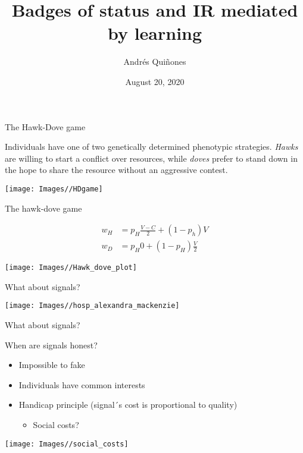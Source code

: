 \documentclass[
  ignorenonframetext,
]{beamer}
\title{Badges of status and IR mediated by learning}
\author{Andrés Quiñones}
\date{August 20, 2020}
\providecommand{\tightlist}{%
  \setlength{\itemsep}{0pt}\setlength{\parskip}{0pt}}
\begin{document}
\frame{\titlepage}

\begin{frame}{The Hawk-Dove game}
\protect\hypertarget{the-hawk-dove-game}{}

Individuals have one of two genetically determined phenotypic
strategies. \emph{Hawks} are willing to start a conflict over resources,
while \emph{doves} prefer to stand down in the hope to share the
resource without an aggressive contest.

\begin{center}\texttt{[image: Images//HDgame]} \end{center}

\end{frame}

\begin{frame}{The hawk-dove game}
\protect\hypertarget{the-hawk-dove-game-1}{}

\begin{align*}
w_H &= p_H \frac{V-C}{2}+(1-p_h) V\\
w_D &= p_H 0 + (1-p_H)\frac{V}{2}
\end{align*} \vspace{-0.8cm}

\begin{center}\texttt{[image: Images//Hawk\_dove\_plot]} \end{center}

\end{frame}

\begin{frame}{What about signals?}
\protect\hypertarget{what-about-signals}{}

\begin{center}\texttt{[image: Images//hosp\_alexandra\_mackenzie]} \end{center}

\end{frame}

\begin{frame}{What about signals?}
\protect\hypertarget{what-about-signals-1}{}

\begin{block}{When are signals honest?}

\begin{itemize}
\tightlist
\item
  Impossible to fake
\item
  Individuals have common interests
\item
  Handicap principle (signal´s cost is proportional to quality)

  \begin{itemize}
  \tightlist
  \item
    Social costs?
  \end{itemize}
\end{itemize}

\begin{center}\texttt{[image: Images//social\_costs]} \end{center}

\end{block}

\end{frame}
\end{document}
